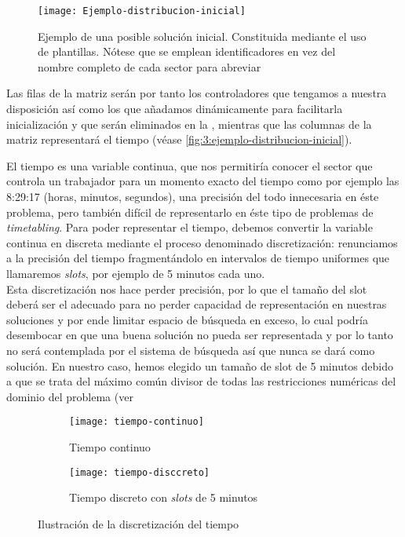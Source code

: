 \begin{figure}
	\centering
	\texttt{[image: Ejemplo-distribucion-inicial]}
	\caption[Ejemplo de una solución inicial]{Ejemplo de una posible solución inicial. Constituida mediante el uso 
		de plantillas. 
		Nótese que se emplean identificadores en vez del nombre completo de cada sector para abreviar}
	\label{fig:3:ejemplo-distribucion-inicial}
\end{figure}

Las filas de la matriz serán por tanto los controladores que tengamos a nuestra disposición así como los que añadamos 
dinámicamente para facilitarla inicialización y que serán eliminados en la \fasedos{}, mientras que las columnas de la 
matriz representará el tiempo (véase \autoref{fig:3:ejemplo-distribucion-inicial}).

El tiempo es una variable continua, que nos permitiría conocer el sector que controla un trabajador para un momento 
exacto del tiempo como por ejemplo las 8:29:17 (horas, minutos, segundos), una precisión del todo innecesaria en éste 
problema, pero también difícil de representarlo en éste tipo de problemas de \textit{timetabling}. Para poder 
representar el tiempo, debemos convertir la variable continua en discreta mediante el proceso denominado 
discretización: renunciamos a la precisión del tiempo fragmentándolo en intervalos de tiempo uniformes que llamaremos 
\textit{slots}, por ejemplo de 5 minutos cada uno.
\\

Esta discretización nos hace perder precisión, por lo que el tamaño del slot deberá ser el adecuado para no perder 
capacidad de representación en nuestras soluciones y por ende limitar espacio de búsqueda en exceso, lo cual podría 
desembocar en que una buena solución no pueda ser representada y por lo tanto no será contemplada por el sistema de 
búsqueda así que nunca se dará como solución.
En nuestro caso, hemos elegido un tamaño de slot de 5 minutos debido a que se trata del máximo común divisor de todas 
las restricciones numéricas del dominio del problema (ver %

\begin{figure}[htbp]
	\begin{subfigure}{\linewidth}
		\centering
		\texttt{[image: tiempo-continuo]}
		\caption{Tiempo continuo}
		\label{fig:timepo-continuo}
	\end{subfigure}

	\begin{subfigure}{\linewidth}
		\centering
		\texttt{[image: tiempo-disccreto]}
		\caption{Tiempo discreto con \textit{slots} de 5 minutos}
		\label{fig:timepo-disccreto}
	\end{subfigure}

	\caption{Ilustración de la discretización del tiempo}
\end{figure}

